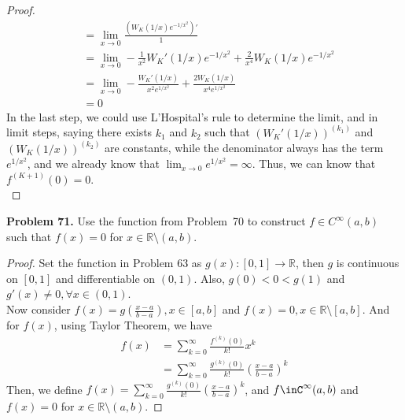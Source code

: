 \documentclass[12pt,leqno]{amsart}
\begin{document}
\begin{proof}
\begin{align*}
    & = \lim_{x\to 0}\frac{\left(W_K(1/x)e^{-1/x^2}\right)'}{1} \\
    & = \lim_{x\to 0} - \frac{1}{x^2}W_K'(1/x)e^{-1/x^2} + \frac{2}{x^4} W_K(1/x)e^{-1/x^2} \\
    & = \lim_{x\to 0} - \frac{W_K'(1/x)}{x^2 e^{1/x^2}} + \frac{2 W_K(1/x)}{x^4 e^{1/x^2}} \\
    & = 0
\end{align*}
In the last step, we could use L'Hospital's rule to determine the limit, and in limit steps, saying there exists $k_1$ and $k_2$ such that $(W_K'(1/x))^{(k_1)}$ and $(W_K(1/x))^{(k_2)}$ are constants, while the denominator always has the term $e^{1/x^2}$, and we already know that $\lim_{x\to 0}e^{1/x^2} = \infty$. Thus, we can know that $f^{(K+1)}(0) = 0$. \\
\hspace*{3em}
\end{proof}

\medskip

\noindent
{\bf Problem 71.}
Use the function from Problem~70 to construct $f\in C^\infty(a,b)$ such that $f(x)=0$ for $x\in\mathbb{R}\setminus (a,b)$.
\begin{proof}
Set the function in Problem 63 as $g(x):[0,1]\rightarrow \mathbb{R}$, then $g$ is continuous on $[0,1]$ and differentiable on $(0,1)$. Also, $g(0)<0<g(1)$ and $g'(x)\neq 0, \forall x\in(0,1)$.\\
\hspace*{3em}Now consider $f(x)=g\left(\frac{x-a}{b-a}\right), x\in [a,b]$ and $f(x)=0, x\in \mathbb{R}\setminus [a,b]$. And for $f(x)$, using Taylor Theorem, we have 
\begin{align*}
    f(x) & = \sum^\infty_{k=0}\frac{f^{(k)}(0)}{k!}x^k \\
    & = \sum^\infty_{k=0}\frac{g^{(k)}(0)}{k!}\left(\frac{x-a}{b-a}\right)^k 
\end{align*}
Then, we define $f(x)=\sum^\infty_{k=0}\frac{g^{(k)}(0)}{k!}\left(\frac{x-a}{b-a}\right)^k $, and $f\inC^\infty(a,b)$ and $f(x)=0$ for $x\in\mathbb{R}\setminus (a,b)$.
\end{proof}

\medskip
\end{document}
